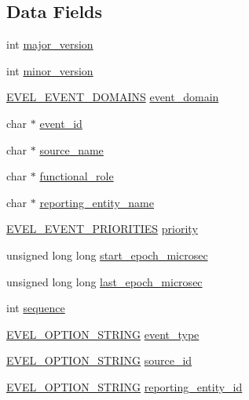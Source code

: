 \subsection*{Data Fields}
\begin{DoxyCompactItemize}
\item 
int \hyperlink{structevent__header_ae350e9b0c027ad985d6513ee01264bc4}{major\+\_\+version}
\item 
int \hyperlink{structevent__header_a390f32dd59f12830f4b88b967a8aee3d}{minor\+\_\+version}
\item 
\hyperlink{evel_8h_ac34d44f4f90f2b63828a32ca9c7b0855}{E\+V\+E\+L\+\_\+\+E\+V\+E\+N\+T\+\_\+\+D\+O\+M\+A\+I\+NS} \hyperlink{structevent__header_a191eca173d8bd260c598a2b79a026ab1}{event\+\_\+domain}
\item 
char $\ast$ \hyperlink{structevent__header_a8123ea69f23cf078fc39304d6eeb6c26}{event\+\_\+id}
\item 
char $\ast$ \hyperlink{structevent__header_a5619697d328950141c426df951988f94}{source\+\_\+name}
\item 
char $\ast$ \hyperlink{structevent__header_a12896af9697cc5e5b678123a381c5086}{functional\+\_\+role}
\item 
char $\ast$ \hyperlink{structevent__header_a105ed7207010f12bb7ffccf3cb712536}{reporting\+\_\+entity\+\_\+name}
\item 
\hyperlink{evel_8h_ad1bf6807fa6710332251611207490484}{E\+V\+E\+L\+\_\+\+E\+V\+E\+N\+T\+\_\+\+P\+R\+I\+O\+R\+I\+T\+I\+ES} \hyperlink{structevent__header_a864abe4580ddd9c0b86a2df7fa19fbbe}{priority}
\item 
unsigned long long \hyperlink{structevent__header_af1abe603869530794daf1f4969c6b50c}{start\+\_\+epoch\+\_\+microsec}
\item 
unsigned long long \hyperlink{structevent__header_a5b7f178cb9755cc1f2b635e6c615133c}{last\+\_\+epoch\+\_\+microsec}
\item 
int \hyperlink{structevent__header_a3640c2b0a997500273b6db73f050ff10}{sequence}
\item 
\hyperlink{evel_8h_a0de5113a7b72de93c0c7b644f7ea7ec3}{E\+V\+E\+L\+\_\+\+O\+P\+T\+I\+O\+N\+\_\+\+S\+T\+R\+I\+NG} \hyperlink{structevent__header_a2ae85cc7be8606552cfeb4ced0a98c80}{event\+\_\+type}
\item 
\hyperlink{evel_8h_a0de5113a7b72de93c0c7b644f7ea7ec3}{E\+V\+E\+L\+\_\+\+O\+P\+T\+I\+O\+N\+\_\+\+S\+T\+R\+I\+NG} \hyperlink{structevent__header_ab35fa935cb5c5850b400fb64f648025b}{source\+\_\+id}
\item 
\hyperlink{evel_8h_a0de5113a7b72de93c0c7b644f7ea7ec3}{E\+V\+E\+L\+\_\+\+O\+P\+T\+I\+O\+N\+\_\+\+S\+T\+R\+I\+NG} \hyperlink{structevent__header_aa69fa9a102ba1aa45412f94197cd3a10}{reporting\+\_\+entity\+\_\+id}
\end{DoxyCompactItemize}


